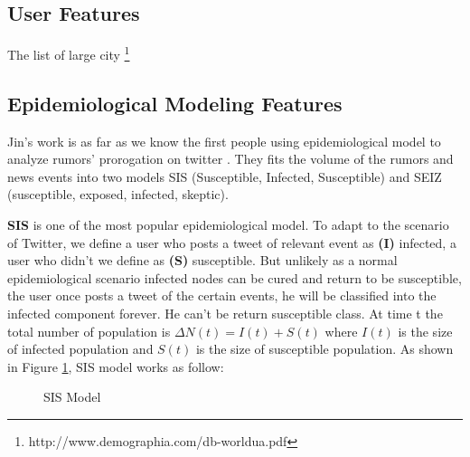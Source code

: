 \subsection{User Features}
The list of large city \footnote{http://www.demographia.com/db-worldua.pdf}
\subsection{Epidemiological Modeling Features}
\label{sec:epide}
Jin's work is as far as we know the first people using epidemiological model to analyze rumors' prorogation on twitter \cite{jin2013epidemiological}. They fits the volume of the rumors and news events into two models SIS (Susceptible, Infected, Susceptible) and SEIZ (susceptible, exposed, infected, skeptic). 

\textbf{SIS} is one of the most popular epidemiological model. To adapt to the scenario of Twitter, we define a user who posts a tweet of relevant event as \textbf{(I)} infected, a user who didn't we define as \textbf{(S)} susceptible. But unlikely as a normal epidemiological scenario infected nodes can be cured and return to be susceptible,  the user once posts a tweet of the certain events, he will be classified into the infected component forever. He can't be return susceptible class. At time t the total number of population is $\Delta N(t)= I(t) + S(t)$ where $I(t)$ is the size of infected population and  $S(t)$ is the size of susceptible population.  As shown in Figure \ref{fig:SIS}, SIS model works as follow:

\begin{figure}[!h]
\center
\def\layersep{2.5cm}
   \caption{SIS Model}
\label{fig:SIS}
\end{figure}
	
